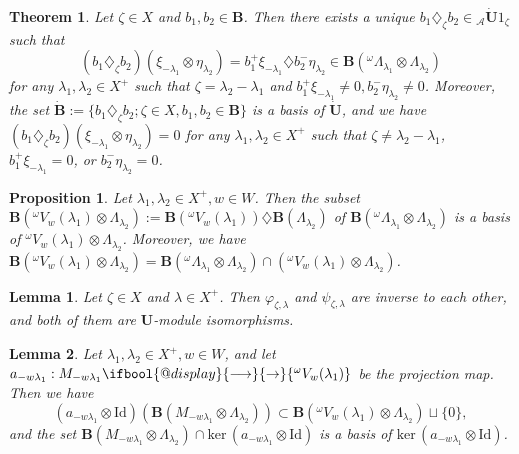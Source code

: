 \documentclass[10pt,a4paper]{amsart}
\makeatletter
\newtheorem{theorem}{Theorem}
\newtheorem{proposition}{Proposition}
\newtheorem{lemma}{Lemma}
\def\l{\lambda}
\renewcommand{\to}{%
   \ifbool{@display}{\longrightarrow}{\rightarrow}%
   }
\makeatother
\begin{document}
\begin{theorem}\label{25.2.1}
Let $\zeta\in X$ and $b_1,b_2\in \mathbf{B}$. Then there exists a unique $b_1\diamondsuit_{\zeta}b_2\in {_{\mathcal{A}}\dot{\mathbf{U}}1_{\zeta}}$ such that
$$(b_1\diamondsuit_{\zeta}b_2)(\xi_{-\lambda_1}\otimes \eta_{\lambda_2})=b_1^+\xi_{-\lambda_1}\diamondsuit b_2^-\eta_{\lambda_2}\in \mathbf{B}({^{\omega}\Lambda_{\lambda_1}}\otimes \Lambda_{\lambda_2})$$
for any $\lambda_1,\lambda_2\in X^+$ such that $\zeta=\lambda_2-\lambda_1$ and $b_1^+\xi_{-\lambda_1}\neq0, b_2^-\eta_{\lambda_2}\neq0$.
Moreover, the set $\dot{\mathbf{B}}:=\{b_1\diamondsuit_{\zeta}b_2;\zeta\in X,b_1,b_2\in \mathbf{B}\}$ is a basis of $\dot{\mathbf{U}}$, and we have $(b_1\diamondsuit_{\zeta}b_2)(\xi_{-\lambda_1}\otimes \eta_{\lambda_2})=0$
for any $\lambda_1,\lambda_2\in X^+$ such that $\zeta\neq \lambda_2-\lambda_1$, $b_1^+\xi_{-\lambda_1}=0$, or $b_2^-\eta_{\lambda_2}=0$.
\end{theorem}

\begin{proposition}\label{canonical basis of demazure otimes highest weight}
Let $\lambda_1,\lambda_2\in X^+,w\in W$. Then the subset $\mathbf{B}({^{\omega}V_{w}(\lambda_1)}\otimes \Lambda_{\lambda_2}):=\mathbf{B}({^{\omega}V_w(\lambda_1)}) \diamondsuit \mathbf{B}(\Lambda_{\lambda_2})$ of $\mathbf{B}({^{\omega}\Lambda_{\lambda_1}}\otimes \Lambda_{\lambda_2})$ is a basis of ${^{\omega}V_{w}(\lambda_1)}\otimes \Lambda_{\lambda_2}$. Moreover, we have $\mathbf{B}({^{\omega}V_{w}(\lambda_1)}\otimes \Lambda_{\lambda_2})=\mathbf{B}({^{\omega}\Lambda_{\lambda_1}}\otimes \Lambda_{\lambda_2})\cap ({^{\omega}V_{w}(\lambda_1)}\otimes \Lambda_{\lambda_2})$.
\end{proposition}

\begin{lemma}\label{isomorphism varphi}
Let $\zeta\in X$ and $\lambda\in X^+$. Then $\varphi_{\zeta, \l}$ and $\psi_{\zeta,\l}$ are inverse to each other, and both of them are $\mathbf{U}$-module isomorphisms.
\end{lemma}

\begin{lemma}\label{a otimes Id is a based map}
Let $\lambda_1,\lambda_2\in X^+,w\in W$, and let $a_{-w\lambda_1}: M_{-w\l_1} \to {^{\omega}V_w(\lambda_1)}$ be the projection map. Then we have  
$$(a_{-w\lambda_1}\otimes \mathrm{Id})(\mathbf{B}(M_{-w\lambda_1}\otimes \Lambda_{\lambda_2})) \subset \mathbf{B}({^{\omega}V_{w}(\lambda_1)}\otimes \Lambda_{\lambda_2})\sqcup \{0\},$$ 
and the set $\mathbf{B}(M_{-w\lambda_1}\otimes \Lambda_{\lambda_2})\cap \mathrm{ker}\,(a_{-w\lambda_1}\otimes \mathrm{Id})$ is a basis of $\mathrm{ker}\,(a_{-w\lambda_1}\otimes \mathrm{Id})$.
\end{lemma}
\end{document}
